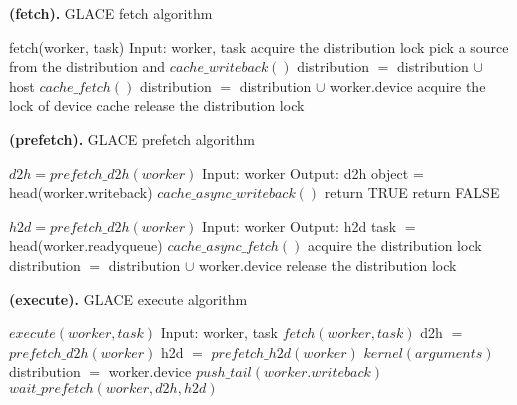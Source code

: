 \documentclass[preprint,11pt]{elsarticle}
\begin{document}
\begin{algorithm}
\caption{{\bf (fetch).} GLACE fetch algorithm}
\label{alg:fetch}
{\footnotesize
\begin{algorithmic} [1]
\STATE fetch(worker, task)
\STATE Input: worker, task
  \STATE acquire the distribution lock   
      \STATE pick a source from the distribution and $cache\_writeback()$
      \STATE distribution $=$ distribution $\cup$ host
    \ENDIF
      \STATE $cache\_fetch()$
      \STATE distribution $=$ distribution $\cup$ worker.device
    \ENDIF
  \ENDIF
  \STATE acquire the lock of device cache
  \STATE release the distribution lock
\ENDFOR
\end{algorithmic}
}
\end{algorithm}

\begin{algorithm}
\caption{{\bf (prefetch).} GLACE prefetch algorithm}
\label{alg:prefetch}
{\footnotesize
\begin{minipage} [t] {0.4\textwidth}
\begin{algorithmic} [1]
\STATE $d2h = prefetch\_d2h(worker)$
\STATE Input: worker
\STATE Output: d2h
  \STATE object = head(worker.writeback)
    \STATE $cache\_async\_writeback()$
    \STATE return TRUE
  \ENDIF
\ENDIF
\STATE return FALSE
\end{algorithmic}
\end{minipage}
\begin{minipage} [t] {0.6\textwidth}
\begin{algorithmic} [1]
\STATE $h2d = prefetch\_d2h(worker)$
\STATE Input: worker
\STATE Output: h2d 
  \STATE task $=$ head(worker.readyqueue)
        \STATE $cache\_async\_fetch()$
        \STATE acquire the distribution lock
        \STATE distribution $=$ distribution $\cup$ worker.device
        \STATE release the distribution lock
      \ENDIF
    \ENDIF
  \ENDFOR
\ENDIF
\end{algorithmic}
\end{minipage}
}
\end{algorithm}

\begin{algorithm}
\caption{{\bf (execute).} GLACE execute algorithm}
\label{alg:execute}
{\footnotesize
\begin{algorithmic} [1]
\STATE $execute(worker, task)$
\STATE Input: worker, task
\STATE $fetch(worker, task)$ \label{ln:simple1}
\STATE d2h $=$ $prefetch\_d2h(worker)$
\STATE h2d $=$ $prefetch\_h2d(worker)$
\STATE $kernel(arguments)$ \label{ln:simple2}
  \STATE distribution $=$ worker.device
  \STATE $push\_tail(worker.writeback)$  
\ENDFOR
\STATE $wait\_prefetch(worker, d2h, h2d)$
\end{algorithmic}
}
\end{algorithm}
\end{document}
